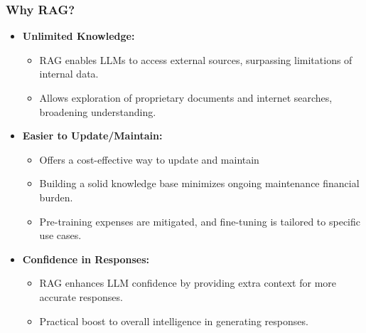 \begin{frame}[fragile]\frametitle{Why RAG?}
\begin{itemize}
  \item \textbf{Unlimited Knowledge:}
    \begin{itemize}
      \item RAG enables LLMs to access external sources, surpassing limitations of internal data.
      \item Allows exploration of proprietary documents and internet searches, broadening understanding.
    \end{itemize}
  
  \item \textbf{Easier to Update/Maintain:}
    \begin{itemize}
      \item Offers a cost-effective way to update and maintain %
      \item Building a solid knowledge base minimizes ongoing maintenance financial burden.
      \item Pre-training expenses are mitigated, and fine-tuning is tailored to specific use cases.
    \end{itemize}
	
  \item \textbf{Confidence in Responses:}
    \begin{itemize}
      \item RAG enhances LLM confidence by providing extra context for more accurate responses.
      \item Practical boost to overall intelligence in generating responses.
    \end{itemize}	
\end{itemize}

\end{frame}


